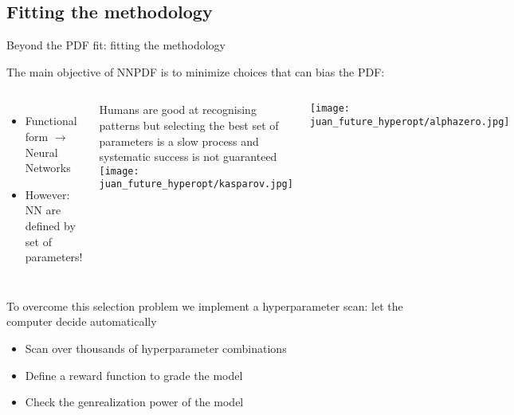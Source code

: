 \newcommand{\gct}{\color{darkgreen}\checkmark}
\newcommand{\rma}{\color{red}\ding{55}}
\newcommand{\bct}{\color{blue}\checkmark}

\author[Juan Cruz-Martinez]{}

\subsection{Fitting the methodology}

\begin{frame}{Beyond the PDF fit: fitting the methodology}

    The main objective of NNPDF is to minimize choices that can bias the PDF:

    \begin{columns}
        \begin{itemize}
            \item[\rma] Functional form $\longrightarrow$ Neural Networks
            \item[\rma] However: NN are defined by set of parameters!
        \end{itemize}

        \vspace{0.2cm}

        Humans are good at recognising patterns but selecting the best
        set of parameters is a slow process and systematic success is not guaranteed
        \texttt{[image: juan\_future\_hyperopt/kasparov.jpg]}

        \texttt{[image: juan\_future\_hyperopt/alphazero.jpg]}
    \end{columns}

    \vspace{0.2cm}

    To overcome this selection problem we implement a {\color{blue}  hyperparameter scan}: let the computer decide automatically

    \begin{itemize}
        \item[\gct] Scan over thousands of hyperparameter combinations
        \item[\gct] Define a reward function to grade the model
        \item[\gct] Check the genrealization power of the model
    \end{itemize}

\end{frame}

